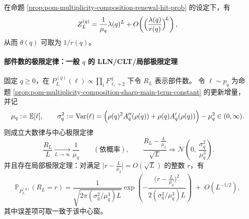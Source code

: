 \begin{corollary}\label{cor:pom-multiplicity-composition-sharp-main-term-from-renewal}
在命题 \ref{prop:pom-multiplicity-composition-renewal-hit-prob} 的设定下，有
\[
Z_L^{(q)}=\frac{1}{\mu_q}\lambda(q)^L+O\!\left(\Bigl(\frac{\lambda(q)}{r(q)}\Bigr)^{\!L}\right),
\]
从而 \(\theta(q)\) 可取为 \(1/r(q)\)。
\end{corollary}




\paragraph{部件数的极限定律：一般 \texorpdfstring{$q$}{q} 的 LLN/CLT/局部极限定理}
\begin{theorem}\label{thm:pom-multiplicity-composition-partcount-generalq-llt}
固定 \(q\ge 0\)，在 \(P_L^{(q)}(\boldsymbol{\ell})\propto \prod_i F_{\ell_i+2}^{\,q}\) 下令 \(R_L\) 表示部件数。
令 \(\ell\sim p_q\) 为命题 \ref{prop:pom-multiplicity-composition-sharp-main-term-constant} 的更新增量，
并记
\[
\mu_q:=\mathbb{E}[\ell],\qquad
\sigma_q^2:=\mathrm{Var}(\ell)=\Bigl(\rho(q)^2A_q''(\rho(q))+\rho(q)A_q'(\rho(q))\Bigr)-\mu_q^2\in(0,\infty).
\]
则成立大数律与中心极限定律
\begin{equation}\label{eq:pom-multiplicity-composition-partcount-lln-clt-generalq}
\boxed{\;
\frac{R_L}{L}\xrightarrow[L\to\infty]{}\frac{1}{\mu_q}\qquad(\text{依概率}),\qquad
\frac{R_L-\frac{L}{\mu_q}}{\sqrt{L}}\Longrightarrow \mathcal{N}\!\left(0,\ \frac{\sigma_q^2}{\mu_q^{3}}\right).}
\end{equation}
并且存在局部极限定理：对满足 \(\bigl|r-\frac{L}{\mu_q}\bigr|=O(\sqrt{L})\) 的整数 \(r\)，有
\begin{equation}\label{eq:pom-multiplicity-composition-partcount-local-limit-generalq}
\mathbb{P}_{P_L^{(q)}}(R_L=r)
=\frac{1}{\sqrt{2\pi(\sigma_q^2/\mu_q^3)L}}
\exp\!\left(-\frac{\bigl(r-\frac{L}{\mu_q}\bigr)^2}{2(\sigma_q^2/\mu_q^3)L}\right)
\;+\;O(L^{-1/2}),
\end{equation}
其中误差项可取一致于该中心窗。
\end{theorem}
